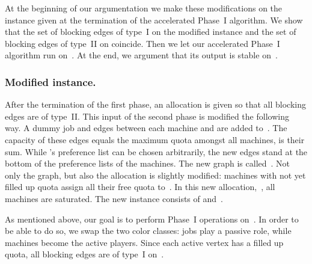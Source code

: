 \documentclass{llncs}
\begin{document}
At the beginning of our argumentation we make these modifications on the instance  given at the termination of the accelerated Phase~I algorithm. We show that the set of blocking edges of type~I on the modified instance  and the set of blocking edges of type~II on  coincide. Then we let our accelerated Phase~I algorithm run on~. At the end, we argument that its output is stable on~.

\subsubsection*{Modified instance.}

After the termination of the first phase, an allocation  is given so that all blocking edges are of type~II. This input of the second phase is modified the following way. A dummy job  and edges between each machine and  are added to~. The capacity of these edges equals the maximum quota amongst all machines,  is their sum. While 's preference list can be chosen arbitrarily, the new edges stand at the bottom of the preference lists of the machines. The new graph is called~. Not only the graph, but also the allocation  is slightly modified: machines with not yet filled up quota assign all their free quota to~. In this new allocation,~, all machines are saturated. The new instance  consists of  and~.

As mentioned above, our goal is to perform Phase~I operations on~. In order to be able to do so, we swap the two color classes: jobs play a passive role, while machines become the active players. Since each active vertex has a filled up quota, all blocking edges are of type~I on~.
\end{document}

